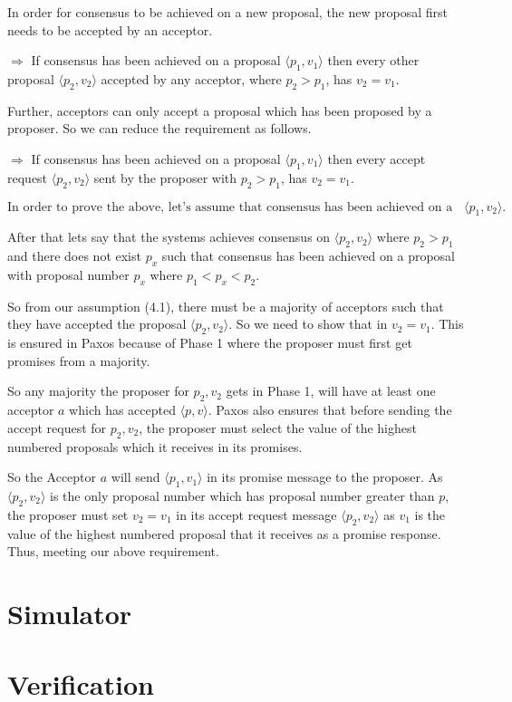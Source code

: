 In order for consensus to be achieved on a new proposal, the new
proposal first needs to be accepted by an acceptor.

$\Rightarrow$ If consensus has been achieved on a proposal
$\langle p_1, v_1 \rangle$ then every other proposal $\langle p_2, v_2 \rangle$
accepted by any acceptor, where $p_2 > p_1$, has $v_2 = v_1$.

Further, acceptors can only accept a proposal which has been proposed
by a proposer. So we can reduce the requirement as follows.

$\Rightarrow$ If consensus has been achieved on a proposal $\langle p_1, v_1 \rangle$
then every accept request $\langle p_2, v_2 \rangle$ sent by the proposer with
$p_2 > p_1$, has $v_2 = v_1$.

\begin{equation}
\textrm{In order to prove the above, let's assume that consensus has been
achieved on a proposal} \langle p_1, v_2 \rangle.
\end{equation}

After that lets say that the systems achieves consensus on
$\langle p_2, v_2 \rangle$ where $p_2 > p_1$ and there does not exist $p_x$ such
that consensus has been achieved on a proposal with proposal
number $p_x$ where $p_1 < p_x < p_2$.

So from our assumption (4.1), there must be a majority of acceptors
such that they have accepted the proposal $\langle p_2, v_2 \rangle$.
So we need to show that in $v_2 = v_1$.
This is ensured in Paxos because of Phase 1 where the proposer must first
get promises from a majority.

So any majority the proposer for $p_2, v_2$ gets in Phase 1,
will have at least one acceptor $a$ which has accepted $\langle p, v \rangle$.
Paxos also ensures that before sending the accept request for
$p_2, v_2$, the proposer must select the value of the highest numbered
proposals which it receives in its promises.

So the Acceptor $a$ will send $\langle p_1, v_1 \rangle$ in its promise message to
the proposer. As $\langle p_2, v_2 \rangle$ is the only proposal number which has
proposal number greater than $p$, the proposer must set $v_2 = v_1$ in its
accept request message $\langle p_2, v_2 \rangle$ as $v_1$ is the value of the
highest numbered proposal that it receives as a promise response.
Thus, meeting our above requirement.

\section{Simulator}


\section{Verification}
